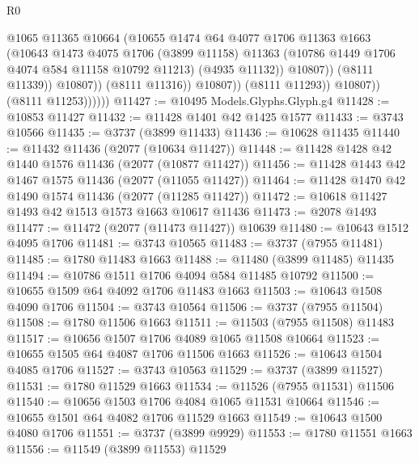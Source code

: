 \begin{lexlean}{R0}
\begin{coremodule}
                                  @1065
                                  @11365
                                  @10664
                                  (@10655
                                    @1474
                                    @64
                                    @4077
                                    @1706
                                    @11363
                                    @1663
                                    (@10643
                                      @1473
                                      @4075
                                      @1706
                                      (@3899 @11158)
                                      @11363
                                      (@10786 @1449 @1706 @4074 @584 @11158 @10792 @11213)
                                      (@4935 @11132))
                                    @10807))
                                (@8111 @11339))
                              @10807))
                          (@8111 @11316))
                        @10807))
                    (@8111 @11293))
                  @10807))
              (@8111 @11253))))))
@11427 := @10495 Models.Glyphs.Glyph.g4
@11428 := @10853 @11427
@11432 := @11428 @1401 @42 @1425 @1577
@11433 := @3743 @10566
@11435 := @3737 (@3899 @11433)
@11436 := @10628 @11435
@11440 := @11432 @11436 (@2077 (@10634 @11427))
@11448 := @11428 @1428 @42 @1440 @1576 @11436 (@2077 (@10877 @11427))
@11456 := @11428 @1443 @42 @1467 @1575 @11436 (@2077 (@11055 @11427))
@11464 := @11428 @1470 @42 @1490 @1574 @11436 (@2077 (@11285 @11427))
@11472 := @10618 @11427 @1493 @42 @1513 @1573 @1663 @10617 @11436
@11473 := @2078 @1493
@11477 := @11472 (@2077 (@11473 @11427)) @10639
@11480 := @10643 @1512 @4095 @1706
@11481 := @3743 @10565
@11483 := @3737 (@7955 @11481)
@11485 := @1780 @11483 @1663
@11488 := @11480 (@3899 @11485) @11435
@11494 := @10786 @1511 @1706 @4094 @584 @11485 @10792
@11500 := @10655 @1509 @64 @4092 @1706 @11483 @1663
@11503 := @10643 @1508 @4090 @1706
@11504 := @3743 @10564
@11506 := @3737 (@7955 @11504)
@11508 := @1780 @11506 @1663
@11511 := @11503 (@7955 @11508) @11483
@11517 := @10656 @1507 @1706 @4089 @1065 @11508 @10664
@11523 := @10655 @1505 @64 @4087 @1706 @11506 @1663
@11526 := @10643 @1504 @4085 @1706
@11527 := @3743 @10563
@11529 := @3737 (@3899 @11527)
@11531 := @1780 @11529 @1663
@11534 := @11526 (@7955 @11531) @11506
@11540 := @10656 @1503 @1706 @4084 @1065 @11531 @10664
@11546 := @10655 @1501 @64 @4082 @1706 @11529 @1663
@11549 := @10643 @1500 @4080 @1706
@11551 := @3737 (@3899 @9929)
@11553 := @1780 @11551 @1663
@11556 := @11549 (@3899 @11553) @11529

\end{coremodule}
\end{lexlean}

